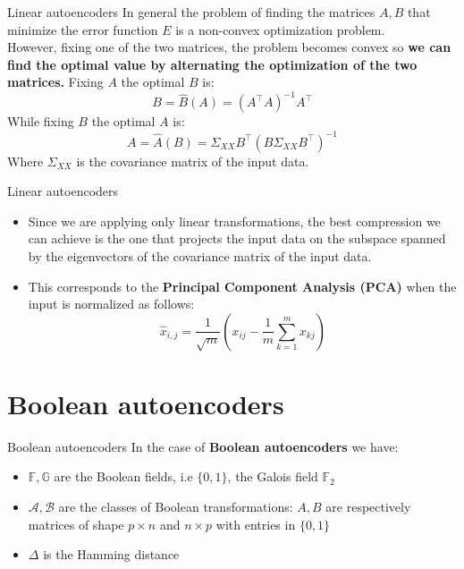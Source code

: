 \documentclass{beamer}
\begin{document}
\begin{frame}{Linear autoencoders}
    In general the problem of finding the matrices $A,B$ that minimize the error function $E$ is a non-convex optimization problem.\\
    \vspace{0.3cm}
    However, fixing one of the two matrices, the problem becomes convex so \textbf{we can find the optimal value by alternating the optimization of the two matrices.}
    Fixing $A$ the optimal $B$ is: 
    \[
        B = \hat{B}(A) = (A^\intercal A)^{-1} A^\intercal 
    \]
    While fixing $B$ the optimal $A$ is:
    \[
        A = \hat{A}(B) = \Sigma_{XX}B^\intercal (B\Sigma_{XX}B^\intercal)^{-1}
    \]
    Where $\Sigma_{XX}$ is the covariance matrix of the input data.
\end{frame}

\begin{frame}{Linear autoencoders}
    \begin{itemize}
        \item Since we are applying only linear transformations, the best compression we can achieve is the one that projects the input data on the subspace spanned by the eigenvectors of the covariance matrix of the input data.\\

        \item This corresponds to the \textbf{Principal Component Analysis (PCA)} when the input is normalized as follows:
        \[
            \hat{x}_{i,j} = \dfrac{1}{\sqrt{m}}\left(x_{ij} - \dfrac{1}{m}\sum_{k=1}^m x_{kj}\right)
        \]    
    \end{itemize}
    
\end{frame}

\section{Boolean autoencoders}
\begin{frame}{Boolean autoencoders}
    In the case of \textbf{Boolean autoencoders} we have:
    \begin{itemize}
        \item $\mathbb{F},\mathbb{G}$ are the Boolean fields, i.e $\{0,1\}$, the Galois field $\mathbb{F}_2$
        \item $\mathcal{A},\mathcal{B}$ are the classes of Boolean transformations: $A,B$ are respectively matrices of shape $p \times n$ and $n \times p$ with entries in $\{0,1\}$
        \item $\Delta$ is the Hamming distance
    \end{itemize}
\end{frame}
\end{document}
